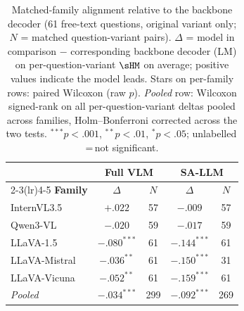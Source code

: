 \begin{table}[ht]
\centering\small\setlength{\tabcolsep}{5pt}
\begin{tabular}{l cc cc}
\toprule
& \multicolumn{2}{c}{\textbf{Full VLM}} & \multicolumn{2}{c}{\textbf{SA-LLM}} \\
\cmidrule(lr){2-3}\cmidrule(lr){4-5}
\textbf{Family} & $\Delta$ & $N$ & $\Delta$ & $N$ \\
\midrule
InternVL3.5 & $+.022$ & 57 & $-.009$ & 57 \\
Qwen3-VL & $-.020$ & 59 & $-.017$ & 59 \\
LLaVA-1.5 & $-.080^{***}$ & 61 & $-.144^{***}$ & 61 \\
LLaVA-Mistral & $-.036^{**}$ & 61 & $-.150^{***}$ & 31 \\
LLaVA-Vicuna & $-.052^{**}$ & 61 & $-.159^{***}$ & 61 \\
\midrule
\textit{Pooled} & $-.034^{***}$ & 299 & $-.092^{***}$ & 269 \\
\bottomrule
\end{tabular}
\caption{Matched-family alignment relative to the backbone decoder (61 free-text questions, original variant only; $N$ = matched question-variant pairs).
$\Delta$ = model in comparison $-$ corresponding backbone decoder (LM) on per-question-variant $\sHM$ on average; positive values indicate the model leads.
Stars on per-family rows: paired Wilcoxon (raw $p$). \textit{Pooled} row: Wilcoxon signed-rank on all per-question-variant deltas pooled across families, Holm--Bonferroni corrected across the two tests. ${}^{***}p{<}.001$, ${}^{**}p{<}.01$, ${}^{*}p{<}.05$; unlabelled\,=\,not significant.}
\label{tab:matched_family_alignment_tests_ft_orig}
\end{table}